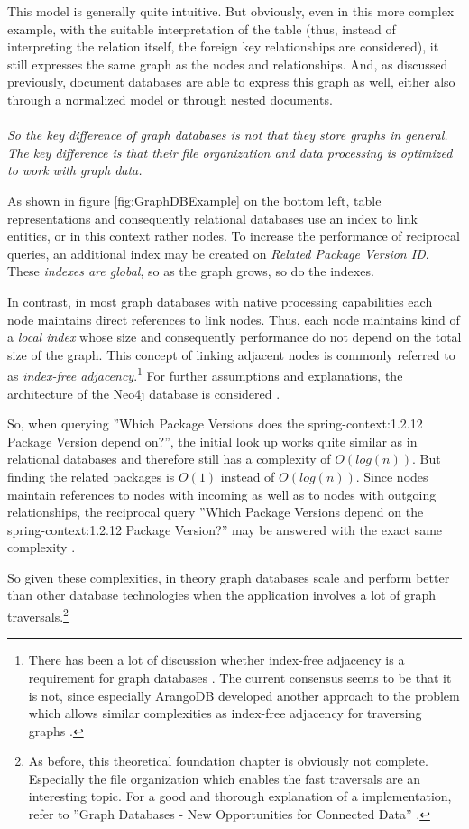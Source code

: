 This model is generally quite intuitive. But obviously, even in this more complex example, with the suitable interpretation of the table (thus, instead of interpreting the relation itself, the foreign key relationships are considered), it still expresses the same graph as the nodes and relationships. And, as discussed previously, document databases are able to express this graph as well, either also through a normalized model or through nested documents.\\\\ 
\emph{So the key difference of graph databases is not that they store graphs in general. The key difference is that their file organization and data processing is optimized to work with graph data.}\par
As shown in figure \ref{fig:GraphDBExample} on the bottom left, table representations and consequently relational databases use an index to link entities, or in this context rather nodes. To increase the performance of reciprocal queries, an additional index may be created on \emph{Related Package Version ID}. These \emph{indexes are global}, so as the graph grows, so do the indexes.\par 
In contrast, in most graph databases with native processing capabilities each node maintains direct references to link nodes. Thus, each node maintains kind of a \emph{local index} whose size and consequently performance do not depend on the total size of the graph. This concept of linking adjacent nodes is commonly referred to as \emph{index-free adjacency}.\footnote{There has been a lot of discussion whether index-free adjacency is a requirement for graph databases \cite{graphdbdiscussion}. The current consensus seems to be that it is not, since especially ArangoDB developed another approach to the problem which allows similar complexities as index-free adjacency for traversing graphs \cite{arangodbhybridindexes}.} For further assumptions and explanations, the architecture of the Neo4j database is considered \cite{neo4j}.\par
So, when querying ''Which Package Versions does the spring-context:1.2.12 Package Version depend on?'', the initial look up works quite similar as in relational databases and therefore still has a complexity of $O(log(n))$. But finding the related packages is $O(1)$ instead of $O(log(n))$. Since nodes maintain references to nodes with incoming as well as to nodes with outgoing relationships, the reciprocal query ''Which Package Versions depend on the spring-context:1.2.12 Package Version?'' may be answered with the exact same complexity \cite{neo4j}.\par 
So given these complexities, in theory graph databases scale and perform better than other database technologies when the application involves a lot of graph traversals.\footnote{As before, this theoretical foundation chapter is obviously not complete. Especially the file organization which enables the fast traversals are an interesting topic. For a good and thorough explanation of a implementation, refer to ''Graph Databases - New Opportunities for Connected Data'' \cite{neo4j}.}

